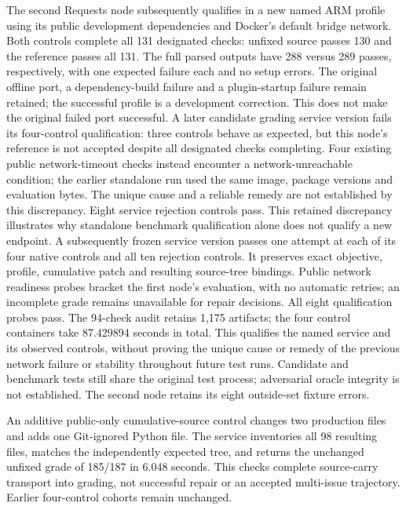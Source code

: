 The second Requests node subsequently qualifies in a new named ARM profile
using its public development dependencies and Docker's default bridge network.
Both controls complete all 131 designated checks: unfixed source passes 130
and the reference passes all 131. The full parsed outputs have 288 versus 289
passes, respectively, with one expected failure each and no setup errors.
The original offline port, a dependency-build failure and a plugin-startup
failure remain retained; the successful profile is a development correction.
This does not make the original failed port successful. A later candidate
grading service version fails its four-control qualification: three controls
behave as expected, but this node's reference is not accepted despite all
designated checks completing. Four existing public network-timeout checks
instead encounter a network-unreachable condition; the earlier standalone
run used the same image, package versions and evaluation bytes. The unique
cause and a reliable remedy are not established by this discrepancy.
Eight service rejection controls pass. This retained discrepancy illustrates
why standalone benchmark qualification alone does not qualify a new endpoint.
A subsequently frozen service version passes one attempt at each of its four
native controls and all ten rejection controls. It preserves exact objective,
profile, cumulative patch and resulting source-tree bindings. Public network
readiness probes bracket the first node's evaluation, with no automatic retries;
an incomplete grade remains unavailable for repair decisions. All eight
qualification probes pass. The 94-check audit retains 1,175 artifacts; the four
control containers take 87.429894 seconds in total. This qualifies the named
service and its observed controls, without proving the unique cause or remedy
of the previous network failure or stability throughout future test runs.
Candidate and benchmark tests still share the original test process; adversarial
oracle integrity is not established. The second node retains its eight
outside-set fixture errors.

An additive public-only cumulative-source control changes two production files
and adds one Git-ignored Python file. The service inventories all 98 resulting
files, matches the independently expected tree, and returns the unchanged
unfixed grade of 185/187 in 6.048 seconds. This checks complete source-carry
transport into grading, not successful repair or an accepted multi-issue
trajectory. Earlier four-control cohorts remain unchanged.

